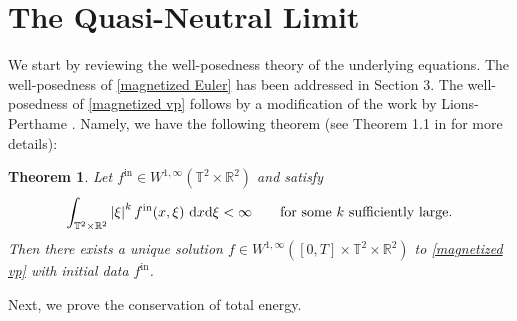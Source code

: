 \documentclass[11pt,reqno]{amsart}
\newtheorem{thm}{Theorem}[section]
\numberwithin{equation}{section}
\def\dd{{\rm d}}
\begin{document}
\section{The Quasi-Neutral Limit}\label{section quasi neutral}
We start by reviewing the well-posedness theory of the underlying equations. 
The well-posedness of \eqref{magnetized Euler} has been addressed in Section 3.
The well-posedness of \eqref{magnetized vp}
follows by 
a modification of 
the work 
by Lions-Perthame \cite{lions1991propagation}. 
Namely, we have the following theorem (see Theorem 1.1 in \cite{porat2025propagation} for more details):
\begin{thm}
Let $f^{\mathrm{in}}\in W^{1,\infty}(\mathbb{T}^{2}\times \mathbb{R}^{2})$
and satisfy
\begin{align*}
\int_{\mathbb{T}^{2}\times \mathbb{R}^{2}}\left\vert \xi\right\vert^{k} f^{\mathrm{in}} (x,\xi) \ \dd x\dd \xi<\infty\qquad\mbox{for some}\ k\ \mbox{sufficiently large}.  
\end{align*}
Then there exists a unique solution $f\in W^{1,\infty}([0,T]\times \mathbb{T}^{2}\times \mathbb{R}^{2})$ to \eqref{magnetized vp} with initial data $f^{\mathrm{in}}$. 
\end{thm}

Next, we prove the conservation of total energy. 
\end{document}

